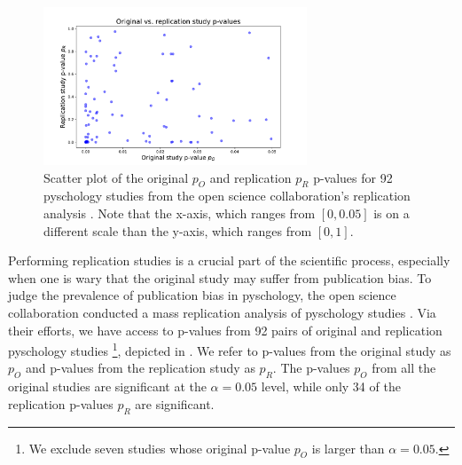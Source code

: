 \documentclass{article}
\begin{document}
\begin{figure}
    \centering
    \includegraphics[width=0.7\textwidth]{replication.pdf} %
    \caption{Scatter plot of the original $p_O$ and replication $p_R$ p-values for 92 pyschology studies from the open science collaboration's replication analysis \cite{OSF}. Note that the x-axis, which ranges from $[0, 0.05]$ is on a different scale than the y-axis, which ranges from $[0, 1]$. }
    \label{fig:replication}
\end{figure}

Performing replication studies is a crucial part of the scientific process, especially when one is wary that the original study may suffer from publication bias. To judge the prevalence of publication bias in pyschology, the open science collaboration conducted a mass replication analysis of pyschology studies \citep{OSF}. Via their efforts, we have access to p-values from 92 pairs of original and replication pyschology studies \footnote{We exclude seven studies whose original p-value $p_O$ is larger than $\alpha=0.05$.}, depicted in . We refer to p-values from the original study as $p_O$ and p-values from the replication study as $p_R$. The p-values $p_O$ from all the original studies are significant at the $\alpha=0.05$ level, while only 34 of the replication p-values $p_R$ are significant. 
\end{document}

